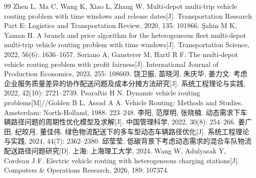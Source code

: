 \documentclass{setp-new}
\begin{document}
\begin{thebibliography}{99}
 Zhen L, Ma C, Wang K, Xiao L, Zhang W. Multi-depot multi-trip vehicle routing problem with time windows and release dates[J]. Transportation Research Part E: Logistics and Transportation Review, 2020, 135: 101866.
 Şahin M K, Yaman H. A branch and price algorithm for the heterogeneous fleet multi-depot multi-trip vehicle routing problem with time windows[J]. Transportation Science, 2022, 56(6): 1636--1657.
 Soriano A, Gansterer M, Hartl R F. The multi-depot vehicle routing problem with profit fairness[J]. International Journal of Production Economics, 2023, 255: 108669.
 饶卫振, 苗晓河, 朱庆华, 姜力文. 考虑企业服务质量差异的协作配送问题及成本分摊方法研究[J]. 系统工程理论与实践, 2022, 42(10): 2721--2739.
 Psaraftis H N. Dynamic vehicle routing problems[M]//Golden B L, Assad A A. Vehicle Routing: Methods and Studies. Amsterdam: North-Holland, 1988: 223--248.
 李阳, 范厚明, 张晓楠. 动态需求下车辆路径问题的周期性优化模型及求解[J]. 中国管理科学, 2022, 30(8): 254--266.
 姜广田, 纪皎月, 董佳伟. 绿色物流配送下的多车型动态车辆路径优化[J]. 系统工程理论与实践, 2024, 44(7): 2362--2380.
 邱莹莹. 低碳背景下考虑动态需求的混合车队物流配送路径问题研究[D]. 上海: 上海理工大学, 2024.
 Wang W, Adulyasak Y, Cordeau J F. Electric vehicle routing with heterogeneous charging stations[J]. Computers \& Operations Research, 2026, 189: 107374.
\end{thebibliography}
\end{document}
